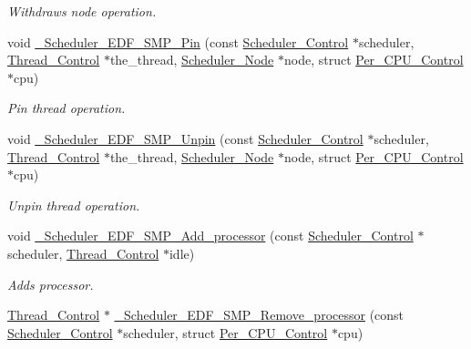 \begin{DoxyCompactItemize}
\begin{DoxyCompactList}\small\item\em Withdraws node operation. \end{DoxyCompactList}\item 
void \mbox{\hyperlink{group__RTEMSScoreSchedulerSMPEDF_gaa02f1e21000ecc093df65bca96e0fc47}{\+\_\+\+Scheduler\+\_\+\+E\+D\+F\+\_\+\+S\+M\+P\+\_\+\+Pin}} (const \mbox{\hyperlink{struct__Scheduler__Control}{Scheduler\+\_\+\+Control}} $\ast$scheduler, \mbox{\hyperlink{struct__Thread__Control}{Thread\+\_\+\+Control}} $\ast$the\+\_\+thread, \mbox{\hyperlink{structScheduler__Node}{Scheduler\+\_\+\+Node}} $\ast$node, struct \mbox{\hyperlink{structPer__CPU__Control}{Per\+\_\+\+C\+P\+U\+\_\+\+Control}} $\ast$cpu)
\begin{DoxyCompactList}\small\item\em Pin thread operation. \end{DoxyCompactList}\item 
void \mbox{\hyperlink{group__RTEMSScoreSchedulerSMPEDF_ga29f19b6fa16d3f37184a9861e7ddb279}{\+\_\+\+Scheduler\+\_\+\+E\+D\+F\+\_\+\+S\+M\+P\+\_\+\+Unpin}} (const \mbox{\hyperlink{struct__Scheduler__Control}{Scheduler\+\_\+\+Control}} $\ast$scheduler, \mbox{\hyperlink{struct__Thread__Control}{Thread\+\_\+\+Control}} $\ast$the\+\_\+thread, \mbox{\hyperlink{structScheduler__Node}{Scheduler\+\_\+\+Node}} $\ast$node, struct \mbox{\hyperlink{structPer__CPU__Control}{Per\+\_\+\+C\+P\+U\+\_\+\+Control}} $\ast$cpu)
\begin{DoxyCompactList}\small\item\em Unpin thread operation. \end{DoxyCompactList}\item 
void \mbox{\hyperlink{group__RTEMSScoreSchedulerSMPEDF_gacf841b619a7503fe3307778691d5a771}{\+\_\+\+Scheduler\+\_\+\+E\+D\+F\+\_\+\+S\+M\+P\+\_\+\+Add\+\_\+processor}} (const \mbox{\hyperlink{struct__Scheduler__Control}{Scheduler\+\_\+\+Control}} $\ast$scheduler, \mbox{\hyperlink{struct__Thread__Control}{Thread\+\_\+\+Control}} $\ast$idle)
\begin{DoxyCompactList}\small\item\em Adds processor. \end{DoxyCompactList}\item 
\mbox{\hyperlink{struct__Thread__Control}{Thread\+\_\+\+Control}} $\ast$ \mbox{\hyperlink{group__RTEMSScoreSchedulerSMPEDF_gac56083b22729e0342b60fb5598bce572}{\+\_\+\+Scheduler\+\_\+\+E\+D\+F\+\_\+\+S\+M\+P\+\_\+\+Remove\+\_\+processor}} (const \mbox{\hyperlink{struct__Scheduler__Control}{Scheduler\+\_\+\+Control}} $\ast$scheduler, struct \mbox{\hyperlink{structPer__CPU__Control}{Per\+\_\+\+C\+P\+U\+\_\+\+Control}} $\ast$cpu)

\end{DoxyCompactItemize}
